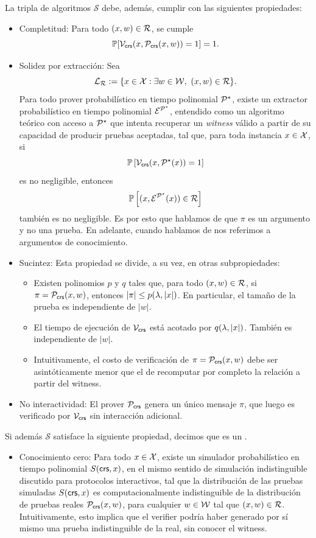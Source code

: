 \begin{definition}[\SNARK, \zkSNARK]
	La tripla de algoritmos $\mathcal{S}$ debe, además, cumplir con las siguientes propiedades:
	\begin{itemize}
		\item Completitud: Para todo $(x,w) \in \mathcal{R}$, se cumple
		$$\mathbb{P}[\mathcal{V}_{\mathsf{crs}}(x,\mathcal{P}_{\mathsf{crs}}(x,w)) = 1] = 1.$$
		\item Solidez por extracción: Sea
		$$\mathcal{L}_{\mathcal{R}} := \{x \in \mathcal{X} : \exists w \in \mathcal{W},\ (x,w) \in \mathcal{R}\}.$$
		Para todo prover probabilístico en tiempo polinomial $\mathcal{P}^\star$, existe un extractor probabilístico en tiempo polinomial $\mathcal{E}^{\mathcal{P}^\star}$, entendido como un algoritmo teórico con acceso a $\mathcal{P}^\star$ que intenta recuperar un \textit{witness} válido a partir de su capacidad de producir pruebas aceptadas, tal que, para toda instancia $x \in \mathcal{X}$, si
		$$\mathbb{P}\left[\mathcal{V}_{\mathsf{crs}}(x, \mathcal{P}^\star(x)) = 1\right]$$
		es no negligible, entonces
		$$\mathbb{P}\left[(x,\mathcal{E}^{\mathcal{P}^\star}(x)) \in \mathcal{R}\right]$$
		también es no negligible. Es por esto que hablamos de que $\pi$ es un argumento y no una prueba. En adelante, cuando hablamos de \SNARK nos referimos a argumentos de conocimiento.
		\item Sucintez: Esta propiedad se divide, a su vez, en otras subpropiedades:
		\begin{itemize}
			\item Existen polinomios $p$ y $q$ tales que, para todo $(x,w) \in \mathcal{R}$, si $\pi = \mathcal{P}_{\mathsf{crs}}(x,w)$, entonces $|\pi| \leq p(\lambda, |x|)$. En particular, el tamaño de la prueba es independiente de $|w|$.
			\item El tiempo de ejecución de $\mathcal{V}_{\mathsf{crs}}$ está acotado por $q(\lambda, |x|)$. También es independiente de $|w|$.
			\item Intuitivamente, el costo de verificación de $\pi = \mathcal{P}_{\mathsf{crs}}(x, w)$ debe ser asintóticamente menor que el de recomputar por completo la relación a partir del witness.
		\end{itemize}
		\item No interactividad: El prover $\mathcal{P}_{\mathsf{crs}}$ genera un único mensaje $\pi$, que luego es verificado por $\mathcal{V}_{\mathsf{crs}}$ sin interacción adicional.
	\end{itemize}
	
		Si además $\mathcal{S}$ satisface la siguiente propiedad, decimos que es un \zkSNARK.
	\begin{itemize}
		\item Conocimiento cero: Para todo $x \in \mathcal{X}$, existe un simulador probabilístico en tiempo polinomial $S(\mathsf{crs},x)$, en el mismo sentido de simulación indistinguible discutido para protocolos \ZK interactivos, tal que la distribución de las pruebas simuladas $S(\mathsf{crs},x)$ es computacionalmente indistinguible de la distribución de pruebas reales $\mathcal{P}_{\mathsf{crs}}(x,w)$, para cualquier $w \in \mathcal{W}$ tal que $(x,w) \in \mathcal{R}$. Intuitivamente, esto implica que el verifier podría haber generado por sí mismo una prueba indistinguible de la real, sin conocer el witness.
	\end{itemize}
\end{definition}

